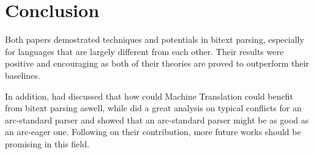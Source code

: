 \documentclass[11pt]{article} %
\begin{document}
\section{Conclusion}

Both papers demostrated techniques and potentials in bitext parsing, especially for languages that are largely different from each other. Their results were positive and encouraging as both of their theories are proved to outperform their baselines.

In addition, \cite{Burkett:2008:TLB:1613715.1613828} had discussed that how could Machine Translation could benefit from bitext parsing aswell, while \cite{Huang:2009:BSP:1699648.1699668} did a great analysis on typical conflicts for an arc-standard parser and showed that an arc-standard parser might be as good as an arc-eager one. Following on their contribution, more future works should be promising in this field.



\end{document}
